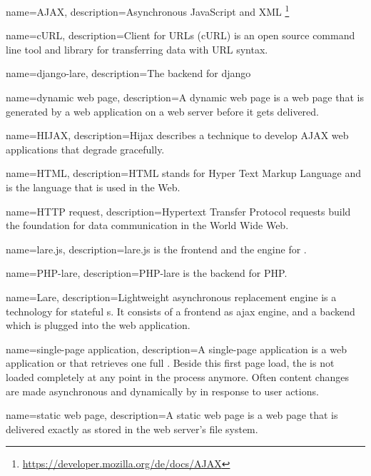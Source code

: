 \usepackage{glossaries}

{
  name=AJAX,
  description={Asynchronous JavaScript and XML \footnote{\url{https://developer.mozilla.org/de/docs/AJAX}}}
}

{
  name=cURL,
  description={Client for URLs (cURL) is an open source command line tool and library for transferring data with URL syntax.}
}

{
  name=django-lare,
  description={The \lare{} backend for django}
}

{
  name=dynamic web page,  
  description={A dynamic web page is a web page that is generated by a web application on a web server before it gets delivered.}
}

{
  name=HIJAX,
  description={Hijax describes a technique to develop AJAX web applications that degrade gracefully.}
}

{
  name=HTML,
  description={HTML stands for Hyper Text Markup Language and is the language that is used in the Web.}
}

{
  name=HTTP request,
  description={Hypertext Transfer Protocol requests build the foundation for data communication in the World Wide Web.}
}

{
  name=lare.js,
  description={lare.js is the \lare{} frontend and the \ajax{} engine for \lare{}.}
}

{
  name=PHP-lare,
  description={PHP-lare is the \lare{} backend for PHP.}
}

{
  name=Lare,
  description={Lightweight asynchronous replacement engine is a technology for stateful \singlePageApplication{}s.
  It consists of a \lare{} frontend as ajax engine, and a \lare{} backend which is plugged into the web application.}
}

{
  name=single-page application,
  description={A single-page application is a web application or \webSite{} that retrieves one full \webPage{}.
  Beside this first page load, the \webSite{} is not loaded completely at any point in the process anymore.
  Often content changes are made asynchronous and dynamically by \ajax{} in response to user actions.}
}

{
  name=static web page,
  description={A static web page is a web page that is delivered exactly as stored in the web server's file system.}
}

